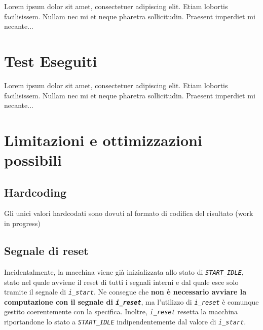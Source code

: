 \documentclass[a4paper,titlepage]{article}
\begin{document}
		Lorem ipsum dolor sit amet, consectetuer adipiscing elit.  
		Etiam lobortis facilisissem.  Nullam nec mi et neque pharetra 
		sollicitudin.  Praesent imperdiet mi necante...

	\section{Test Eseguiti}
       
		Lorem ipsum dolor sit amet, consectetuer adipiscing elit.  
		Etiam lobortis facilisissem.  Nullam nec mi et neque pharetra 
		sollicitudin.  Praesent imperdiet mi necante...
	\section{Limitazioni e ottimizzazioni possibili}
		\subsection{Hardcoding}
			Gli unici valori hardcodati sono dovuti al formato di codifica del risultato (work in progress)
		\subsection{Segnale di reset}
			Incidentalmente, la macchina viene già inizializzata allo stato di \textit{\texttt{START\_IDLE}}, stato nel quale avviene il reset di tutti i segnali interni e dal quale esce solo tramite il segnale di \textit{\texttt{i\_start}}.
			Ne consegue che \textbf{non è necessario avviare la computazione con il segnale di \textit{\texttt{i\_reset}}}, ma l'utilizzo di \textit{\texttt{i\_reset}} è comunque gestito coerentemente con la specifica. Inoltre, \textit{\texttt{i\_reset}} resetta la macchina riportandone lo stato a \textit{\texttt{START\_IDLE}} indipendentemente dal valore di \textit{\texttt{i\_start}}.
\end{document}
